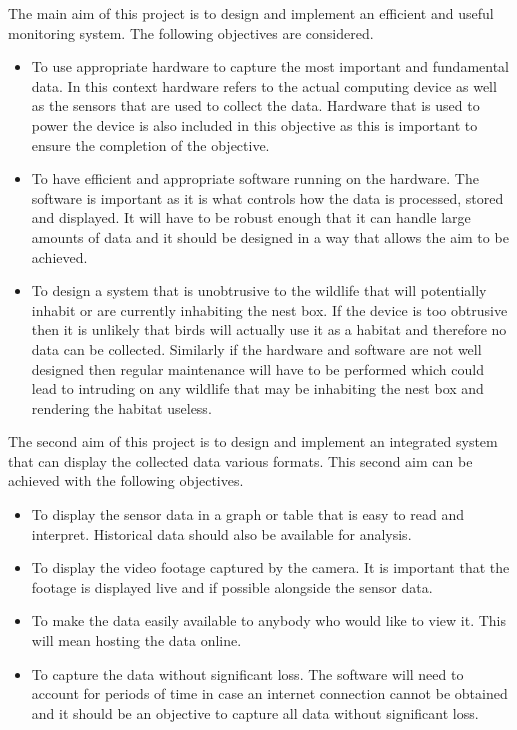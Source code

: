 \documentclass[10pt,a4paper]{article}
\begin{document}
The main aim of this project is to design and implement an efficient and useful monitoring system. The following objectives are considered. 
\begin{itemize}
\item To use appropriate hardware to capture the most important and fundamental data. In this context hardware refers to the actual computing device as well as the sensors that are used to collect the data. Hardware that is used to power the device is also included in this objective as this is important to ensure the completion of the objective.

\item To have efficient and appropriate software running on the hardware. The software is important as it is what controls how the data is processed, stored and displayed. It will have to be robust enough that it can handle large amounts of data and it should be designed in a way that allows the aim to be achieved. 

\item To design a system that is unobtrusive to the wildlife that will potentially inhabit or are currently inhabiting the nest box. If the device is too obtrusive then it is unlikely that birds will actually use it as a habitat and therefore no data can be collected. Similarly if the hardware and software are not well designed then regular maintenance will have to be performed which could lead to intruding on any wildlife that may be inhabiting the nest box and rendering the habitat useless. 
\end{itemize}

The second aim of this project is to design and implement an integrated system that can display the collected data various formats. This second aim can be achieved with the following objectives.
\begin{itemize}
\item To display the sensor data in a graph or table that is easy to read and interpret. Historical data should also be available for analysis. 

\item To display the video footage captured by the camera. It is important that the footage is displayed live and if possible alongside the sensor data. 

\item To make the data easily available to anybody who would like to view it. This will mean hosting the data online. 

\item To capture the data without significant loss. The software will need to account for periods of time in case an internet connection cannot be obtained and it should be an objective to capture all data without significant loss. 
\end{itemize}
\end{document}
